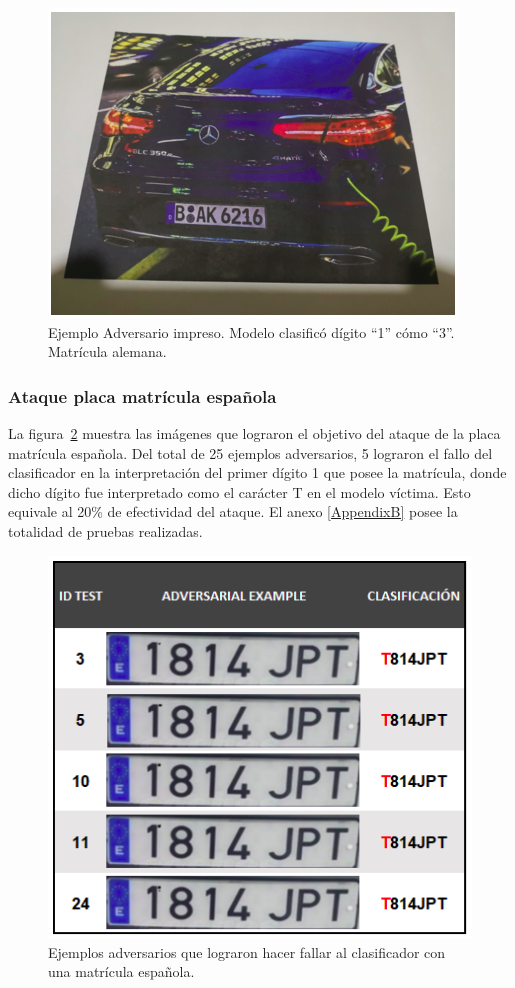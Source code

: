  \begin{figure}[!h]
    \centering
    \includegraphics[scale = 1.1]{Figures/figura_61.PNG}
    \decoRule
    \caption[Ejemplo Adversario impreso matrícula alemana]{Ejemplo Adversario impreso. Modelo clasificó dígito “1” cómo “3”. Matrícula alemana.}
    \label{fig:61}
\end{figure}



\subsubsection{Ataque placa matrícula española}
La figura~\ref{fig:62} muestra las imágenes que lograron el objetivo del ataque de la placa matrícula española. Del total de 25 ejemplos adversarios, 5 lograron el fallo del clasificador en la interpretación del primer dígito 1 que posee la matrícula, donde dicho dígito fue interpretado como el carácter T en el modelo víctima. Esto equivale al 20\% de efectividad del ataque. El anexo \ref{AppendixB} posee la totalidad de pruebas realizadas.

 \begin{figure}[!h]
    \centering
    \includegraphics[scale = 1.1]{Figures/figura_62.PNG}
    \decoRule
    \caption[Resultados clasificador con una matrícula española]{Ejemplos adversarios que lograron hacer fallar al clasificador con una matrícula española.}
    \label{fig:62}
\end{figure}




